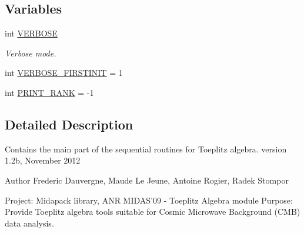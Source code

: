 \subsection*{Variables}
\begin{DoxyCompactItemize}
\item 
int \hyperlink{toeplitz_8c_ab848ce91ba14d3dc5c87d0b42f3a1c0d}{V\-E\-R\-B\-O\-S\-E}
\begin{DoxyCompactList}\small\item\em Verbose mode. \end{DoxyCompactList}\item 
int \hyperlink{toeplitz_8c_a005f790383498397d0fdad1513881e3f}{V\-E\-R\-B\-O\-S\-E\-\_\-\-F\-I\-R\-S\-T\-I\-N\-I\-T} = 1
\item 
int \hyperlink{toeplitz_8c_a300d52d9923297872ffb24962a0f0ce6}{P\-R\-I\-N\-T\-\_\-\-R\-A\-N\-K} = -\/1
\end{DoxyCompactItemize}


\subsection{Detailed Description}
Contains the main part of the sequential routines for Toeplitz algebra. version 1.\-2b, November 2012 \begin{DoxyAuthor}{Author}
Frederic Dauvergne, Maude Le Jeune, Antoine Rogier, Radek Stompor
\end{DoxyAuthor}
Project\-: Midapack library, A\-N\-R M\-I\-D\-A\-S'09 -\/ Toeplitz Algebra module Purpose\-: Provide Toeplitz algebra tools suitable for Cosmic Microwave Background (C\-M\-B) data analysis.

